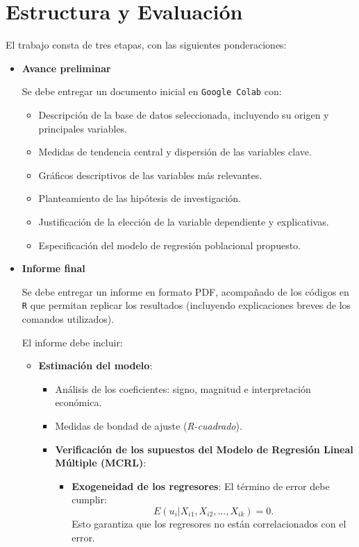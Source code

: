 \documentclass[a4paper,12pt]{article}
\begin{document}
\section{Estructura y Evaluación}

El trabajo consta de tres etapas, con las siguientes ponderaciones:

\begin{itemize}
    \item \textbf{Avance preliminar }
    
    Se debe entregar un documento inicial en \texttt{Google Colab} con:
    \begin{itemize}
        \item Descripción de la base de datos seleccionada, incluyendo su origen y principales variables.
        \item Medidas de tendencia central y dispersión de las variables clave.
        \item Gráficos descriptivos de las variables más relevantes.
        \item Planteamiento de las hipótesis de investigación.
        \item Justificación de la elección de la variable dependiente y explicativas.
        \item Especificación del modelo de regresión poblacional propuesto.
    \end{itemize}
    
    \item \textbf{Informe final}

    Se debe entregar un informe en formato PDF, acompañado de  los códigos en \texttt{R} que permitan replicar los resultados (incluyendo explicaciones breves de los comandos utilizados).
    
    El informe debe incluir:
    
    \begin{itemize}
        \item \textbf{Estimación del modelo}: 
        \begin{itemize}
            \item Análisis de los coeficientes: signo, magnitud e interpretación económica.
         
            \item Medidas de bondad de ajuste (\textit{R-cuadrado}).
       \item \textbf{Verificación de los supuestos del Modelo de Regresión Lineal Múltiple (MCRL)}:
        \begin{itemize}
            \item \textbf{Exogeneidad de los regresores}: El término de error debe cumplir:
            \[
            E(u_i | X_{i1}, X_{i2}, \dots, X_{ik}) = 0.
            \]
            Esto garantiza que los regresores no están correlacionados con el error.


\end{itemize}
\end{itemize}
\end{itemize}
\end{itemize}
\end{document}
